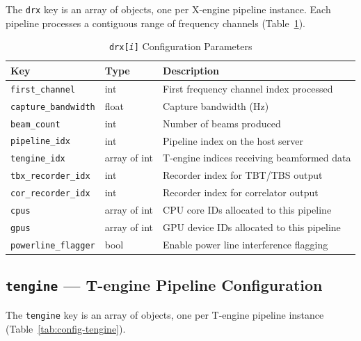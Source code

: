 The \texttt{drx} key is an array of objects, one per X-engine pipeline instance.
Each pipeline processes a contiguous range of frequency channels (Table~\ref{tab:config-drx}).

\begin{table}[htbp]
    \centering
    \caption{\texttt{drx[\textit{i}]} Configuration Parameters}
    \label{tab:config-drx}
    \begin{tabular}{llp{7cm}}
        \toprule
        \textbf{Key} & \textbf{Type} & \textbf{Description} \\
        \midrule
        \texttt{first\_channel}       & int          & First frequency channel index processed \\
        \texttt{capture\_bandwidth}   & float        & Capture bandwidth (Hz) \\
        \texttt{beam\_count}          & int          & Number of beams produced \\
        \texttt{pipeline\_idx}        & int          & Pipeline index on the host server \\
        \texttt{tengine\_idx}         & array of int & T-engine indices receiving beamformed data \\
        \texttt{tbx\_recorder\_idx}   & int          & Recorder index for TBT/TBS output \\
        \texttt{cor\_recorder\_idx}   & int          & Recorder index for correlator output \\
        \texttt{cpus}                 & array of int & CPU core IDs allocated to this pipeline \\
        \texttt{gpus}                 & array of int & GPU device IDs allocated to this pipeline \\
        \texttt{powerline\_flagger}   & bool         & Enable power line interference flagging \\
        \bottomrule
    \end{tabular}
\end{table}

\subsection{\texttt{tengine} --- T-engine Pipeline Configuration}

The \texttt{tengine} key is an array of objects, one per T-engine pipeline
instance (Table~\ref{tab:config-tengine}).

